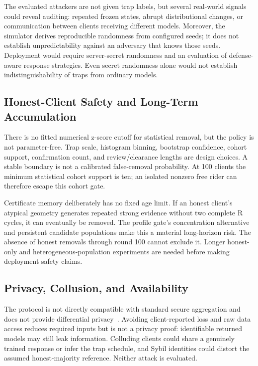\documentclass[conference]{IEEEtran}
\begin{document}
The evaluated attackers are not given trap labels, but several real-world
signals could reveal auditing: repeated frozen states, abrupt distributional
changes, or communication between clients receiving different models. Moreover,
the simulator derives reproducible randomness from configured seeds; it does
not establish unpredictability against an adversary that knows those seeds.
Deployment would require server-secret randomness and an evaluation of
defense-aware response strategies. Even secret randomness alone would not
establish indistinguishability of traps from ordinary models.

\subsection{Honest-Client Safety and Long-Term Accumulation}
There is no fitted numerical z-score cutoff for statistical removal, but the
policy is not parameter-free. Trap scale, histogram binning, bootstrap confidence,
cohort support, confirmation count, and review/clearance lengths are design
choices. A stable boundary is not a calibrated false-removal probability.
At 100 clients the minimum statistical cohort support is ten; an isolated
nonzero free rider can therefore escape this cohort gate.

Certificate memory deliberately has no fixed age limit. If an honest client's
atypical geometry generates repeated strong evidence without two complete R
cycles, it can eventually be removed. The profile gate's concentration
alternative and persistent candidate populations make this a material
long-horizon risk. The absence of honest removals through round 100 cannot
exclude it. Longer honest-only and heterogeneous-population experiments are
needed before making deployment safety claims.

\subsection{Privacy, Collusion, and Availability}
The protocol is not directly compatible with standard secure aggregation and
does not provide differential privacy~\cite{bonawitz2017practical}. Avoiding
client-reported loss and raw data access reduces required inputs but is not a
privacy proof: identifiable returned models may still leak information.
Colluding clients could share a genuinely trained response or infer the trap
schedule, and Sybil identities could distort the assumed honest-majority
reference. Neither attack is evaluated.
\end{document}

